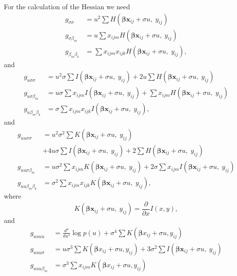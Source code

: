 \documentclass[a4paper,11pt]{article}
\newcommand{\bx}{\ensuremath{\mathbf{x}}}
\newcommand{\bb}{\ensuremath{\boldsymbol{\beta}}}
\newcommand{\dGy}{\ensuremath{H(\bb\bx_{ij} + \sigma u, \; y_{ij})}}
\newcommand{\Iy}{\ensuremath{I(\bb\bx_{ij} + \sigma u, \; y_{ij})}}
\newcommand{\Ky}{\ensuremath{K(\bb\bx_{ij} + \sigma u, \; y_{ij})}}
\newcommand{\be}{\begin{equation}}
\newcommand{\ee}{\end{equation}}
\begin{document}
For the calculation of the Hessian we need
\be
\begin{split}
g_{\sigma\sigma} &= u^2 \sum \dGy \\
g_{\sigma\beta_m} &= u \sum x_{ijm} \dGy \\
g_{\beta_m\beta_k} &= \sum x_{ijm} x_{ijk} \dGy,
\end{split}
\ee
and
\be
\begin{split}
g_{u\sigma\sigma} &= u^2 \sigma \sum \Iy + 2 u \sum \dGy \\
g_{u\sigma\beta_m} &= u \sigma \sum x_{ijm} \Iy + \sum x_{ijm} \dGy\\
g_{u\beta_m\beta_k} &= \sigma \sum x_{ijm} x_{ijk} \Iy,
\end{split}
\ee
and
\be
\begin{split}
g_{uu\sigma\sigma} &= u^2 \sigma^2\sum \Ky\\ 
& + 4 u\sigma \sum \Iy + 2 \sum
\dGy\\ 
g_{uu\sigma\beta_m} &= u \sigma^2\sum x_{ijm} \Ky +  2 \sigma \sum x_{ijm}
\Iy \\
g_{uu\beta_m\beta_k} &= \sigma^2 \sum x_{ijm} x_{ijk} \Ky,
\end{split}
\ee
where
\be
\Ky = \frac{\partial}{\partial x} I(x, y),
\ee
and
\be
\begin{split}
g_{uuuu} &= \frac{d^4}{d u^4}\log p(u) + \sigma^4 \sum K(\bb x_{ij} +
\sigma u, y_{ij}) \\ 
g_{uuu\sigma} &= u\sigma^3 \sum K(\bb x_{ij} + \sigma u, y_{ij}) + 3
\sigma^2 \sum \Iy \\
g_{uuu\beta_m} &= \sigma^3 \sum x_{ijm}K(\bb x_{ij} + \sigma u, y_{ij}) \\
\end{split} 
\ee 
\end{document}
